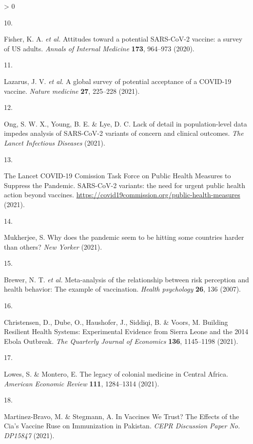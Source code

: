 \documentclass[
  12pt,
]{article}
\newlength{\cslhangindent}
\newlength{\csllabelwidth}
\newenvironment{CSLReferences}[2] %
 {%
  \setlength{\parindent}{0pt}
  \ifodd #1 \everypar{\setlength{\hangindent}{\cslhangindent}}\ignorespaces\fi
  \ifnum #2 > 0
  \setlength{\parskip}{#2\baselineskip}
  \fi
 }%
 {}
\newcommand{\CSLLeftMargin}[1]{\parbox[t]{\csllabelwidth}{#1}}
\newcommand{\CSLRightInline}[1]{\parbox[t]{\linewidth - \csllabelwidth}{#1}\break}
\begin{document}
\begin{CSLReferences}{0}{0}
\leavevmode\hypertarget{ref-fisher2020attitudes}{}%
\CSLLeftMargin{10. }
\CSLRightInline{Fisher, K. A. \emph{et al.} {Attitudes toward a potential SARS-CoV-2 vaccine: a survey of US adults}. \emph{{Annals of Internal Medicine}} \textbf{173}, 964--973 (2020).}

\leavevmode\hypertarget{ref-lazarus2020nature}{}%
\CSLLeftMargin{11. }
\CSLRightInline{Lazarus, J. V. \emph{et al.} {A global survey of potential acceptance of a COVID-19 vaccine}. \emph{Nature medicine} \textbf{27}, 225--228 (2021).}

\leavevmode\hypertarget{ref-ong2021lack}{}%
\CSLLeftMargin{12. }
\CSLRightInline{Ong, S. W. X., Young, B. E. \& Lye, D. C. {Lack of detail in population-level data impedes analysis of SARS-CoV-2 variants of concern and clinical outcomes}. \emph{The Lancet Infectious Diseases} (2021).}

\leavevmode\hypertarget{ref-lancettask}{}%
\CSLLeftMargin{13. }
\CSLRightInline{The Lancet COVID-19 Comission Task Force on Public Health Measures to Suppress the Pandemic. {SARS-CoV-2 variants: the need for urgent public health action beyond vaccines}. \url{https://covid19commission.org/public-health-measures} (2021).}

\leavevmode\hypertarget{ref-mukherjee}{}%
\CSLLeftMargin{14. }
\CSLRightInline{Mukherjee, S. Why does the pandemic seem to be hitting some countries harder than others? \emph{New Yorker} (2021).}

\leavevmode\hypertarget{ref-brewer2007meta}{}%
\CSLLeftMargin{15. }
\CSLRightInline{Brewer, N. T. \emph{et al.} Meta-analysis of the relationship between risk perception and health behavior: The example of vaccination. \emph{Health psychology} \textbf{26}, 136 (2007).}

\leavevmode\hypertarget{ref-christensen2020building}{}%
\CSLLeftMargin{16. }
\CSLRightInline{Christensen, D., Dube, O., Haushofer, J., Siddiqi, B. \& Voors, M. {Building Resilient Health Systems: Experimental Evidence from Sierra Leone and the 2014 Ebola Outbreak}. \emph{The Quarterly Journal of Economics} \textbf{136}, 1145--1198 (2021).}

\leavevmode\hypertarget{ref-Lowes2018}{}%
\CSLLeftMargin{17. }
\CSLRightInline{Lowes, S. \& Montero, E. {The legacy of colonial medicine in Central Africa}. \emph{American Economic Review} \textbf{111}, 1284--1314 (2021).}

\leavevmode\hypertarget{ref-martinez2021vaccines}{}%
\CSLLeftMargin{18. }
\CSLRightInline{Martinez-Bravo, M. \& Stegmann, A. {In Vaccines We Trust? The Effects of the Cia's Vaccine Ruse on Immunization in Pakistan}. \emph{CEPR Discussion Paper No. DP15847} (2021).}


\end{CSLReferences}
\end{document}

